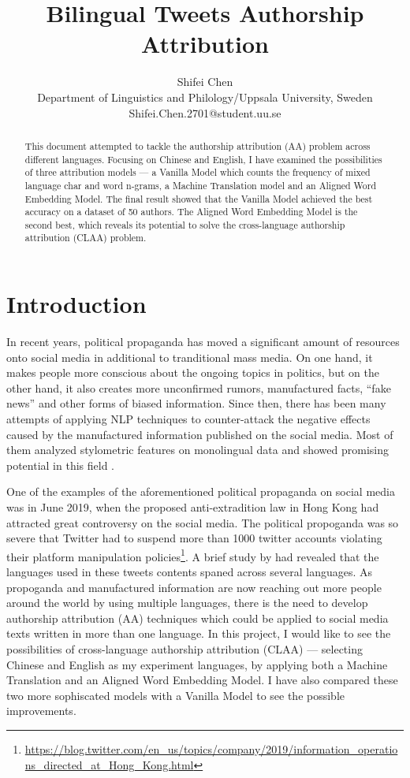 \documentclass[11pt,a4paper]{article}
\title{Bilingual Tweets Authorship Attribution}
\author{
 Shifei Chen \\
 Department of Linguistics and Philology/Uppsala University, Sweden \\
  {\sf Shifei.Chen.2701@student.uu.se} \\
}
\date{}
\begin{document}
\maketitle
\begin{abstract}
  This document attempted to tackle the authorship attribution (AA) problem across different languages. Focusing on Chinese and English, I have examined the possibilities of three attribution models --- a Vanilla Model which counts the frequency of mixed language char and word n-grams, a Machine Translation model and an Aligned Word Embedding Model. The final result showed that the Vanilla Model achieved the best accuracy on a dataset of 50 authors. The Aligned Word Embedding Model is the second best, which reveals its potential to solve the cross-language authorship attribution (CLAA) problem.
\end{abstract}

\section{Introduction}

In recent years, political propaganda has moved a significant amount of resources onto social media in additional to tranditional mass media. On one hand, it makes people more conscious about the ongoing topics in politics, but on the other hand, it also creates more unconfirmed rumors, manufactured facts, ``fake news'' and other forms of biased information. Since then, there has been many attempts of applying NLP techniques to counter-attack the negative effects caused by the manufactured information published on the social media. Most of them analyzed stylometric features on monolingual data and showed promising potential in this field \cite{rocha2016authorship}.

One of the examples of the aforementioned political propaganda on social media was in June 2019, when the proposed anti-extradition law in Hong Kong had attracted great controversy on the social media. The political propoganda was so severe that Twitter had to suspend more than 1000 twitter accounts violating their platform manipulation policies\footnote{\raggedright\url{https://blog.twitter.com/en_us/topics/company/2019/information_operations_directed_at_Hong_Kong.html}}. A brief study by \citet{wood_mcminn_feng_2019} had revealed that the languages used in these tweets contents spaned across several languages. As propoganda and manufactured information are now reaching out more people around the world by using multiple languages, there is the need to develop authorship attribution (AA) techniques which could be applied to social media texts written in more than one language. In this project, I would like to see the possibilities of cross-language authorship attribution (CLAA) --- selecting Chinese and English as my experiment languages, by applying both a Machine Translation and an Aligned Word Embedding Model. I have also compared these two more sophiscated models with a Vanilla Model to see the possible improvements.
\end{document}
